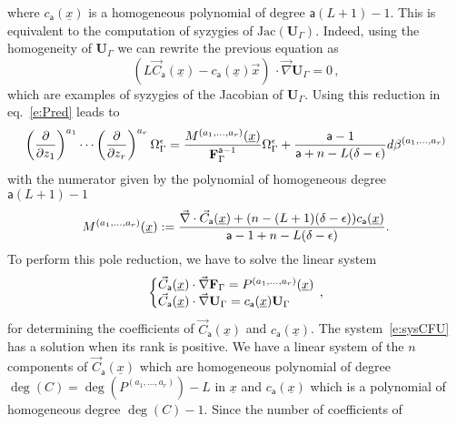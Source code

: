 \documentclass[a4paper,12pt]{article}
\numberwithin{equation}{section}
\numberwithin{figure}{section}
\begin{document}
where $ c_{\mathsf{a}}(\underline x)$ is a homogeneous polynomial of
degree $\mathsf{a}(L+1)-1$. This is equivalent to the computation of syzygies of $\text{Jac}( \mathbf U_\Gamma)$. Indeed,  using the homogeneity of $\mathbf{U}_\Gamma$ we can rewrite the previous equation as 
\begin{equation}
 \left( L   \vec
C_{\mathsf{a}}(\underline x) -
c_{\mathsf{a}}(\underline x) \vec{x} \right) \, \cdot\vec\nabla
\mathbf{U}_\Gamma =0\, ,
\end{equation}
which are examples of syzygies of the Jacobian of $\mathbf U_\Gamma$. Using this reduction in eq.~\eqref{e:Pred} leads to
% 
\begin{equation}\label{e:RedFinal}
\left(\partial\over \partial z_1\right)^{a_1}\cdots\left(\partial
  \over\partial z_r\right)^{a_r} \Omega_\Gamma^\epsilon={
M^{(a_1,\dots,a_r)}
     (\underline x)
\over \textbf{F}_\Gamma^{\mathsf{a}-1}}\Omega_\Gamma^\epsilon
+{  \mathsf{a}-1\over \mathsf{a}+n-L(\delta-\epsilon)} d\beta^{(a_1,\dots,a_r)}
\end{equation}
with the numerator given by the polynomial of homogeneous degree $\mathsf{a}(L+1)-1$
\begin{equation}
  \label{e:Mfinal}
  M^{(a_1,\dots,a_r)}(\underline x):={\vec\nabla \cdot \vec C_{\mathsf{a}}
     (\underline x)
+  (n-(L+1)(\delta-\epsilon)) 
    c_{\mathsf{a}}(\underline x)\over \mathsf{a}-1+n-L(\delta-\epsilon) }.
\end{equation}
%
To perform this pole reduction, 
 we have to solve the linear system
\begin{equation}\label{e:sysCFU}
   \left\{\begin{array}{@{}l@{}}
\vec C_{\mathsf{a}} (\underline x) \cdot \vec \nabla \textbf{F}_\Gamma
            =    P^{(a_1,\dots,a_r)}(\underline x)\\
\vec C_{\mathsf{a}} (\underline x)\cdot\vec \nabla\textbf{U}_\Gamma= c_{{\mathsf{a}}}(\underline x) \textbf{U}_\Gamma 
  \end{array}\right.\,,
\end{equation}
for determining the coefficients of $\vec C_{\mathsf{a}}(\underline
x)$ and $c_{\mathsf{a}}(\underline x)$.
%
The system~\eqref{e:sysCFU} has a solution when its rank is positive.
We have a linear system of the $n$ components of $\vec C_{\mathsf{a}}(\underline
x) $ which are homogeneous polynomial of degree $\deg(C)=\deg( P^{(a_1,\dots,a_r)})-L $ in
$\underline x$ and  $ c_{{\mathsf{a}}}(\underline x) $ which is a polynomial of
homogeneous degree $\deg(C)-1$.   Since the number of coefficients of
\end{document}

